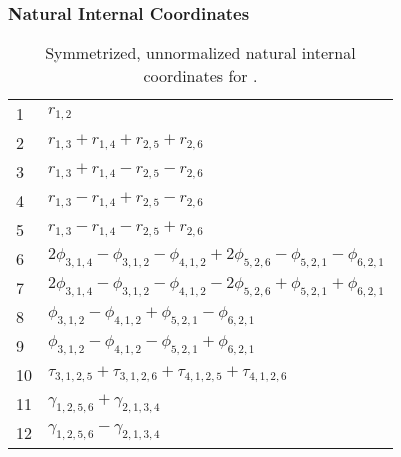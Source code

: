 \documentclass[10pt,oneside]{article}
\begin{document}
\subsubsection*{Natural Internal Coordinates}
\begin{table}[h!]
\centering
\caption{Symmetrized, unnormalized natural internal coordinates for .}
\small
\begin{tabular}{ll}
  1   & $r_{1,2}$ \\
  2   & $r_{1,3} + r_{1,4} + r_{2,5} + r_{2,6}$ \\
  3   & $r_{1,3} + r_{1,4} - r_{2,5} - r_{2,6}$ \\
  4   & $r_{1,3} - r_{1,4} + r_{2,5} - r_{2,6}$ \\
  5   & $r_{1,3} - r_{1,4} - r_{2,5} + r_{2,6}$ \\
  6   & $2\phi_{3,1,4} - \phi_{3,1,2} - \phi_{4,1,2} + 2\phi_{5,2,6} - \phi_{5,2,1} - \phi_{6,2,1}$ \\
  7   & $2\phi_{3,1,4} - \phi_{3,1,2} - \phi_{4,1,2} - 2\phi_{5,2,6} + \phi_{5,2,1} + \phi_{6,2,1}$ \\
  8   & $\phi_{3,1,2} - \phi_{4,1,2} + \phi_{5,2,1} - \phi_{6,2,1}$ \\
  9   & $\phi_{3,1,2} - \phi_{4,1,2} - \phi_{5,2,1} + \phi_{6,2,1}$ \\
  10  & $\tau_{3,1,2,5} + \tau_{3,1,2,6} + \tau_{4,1,2,5} + \tau_{4,1,2,6}$ \\
  11  & $\gamma_{1,2,5,6} + \gamma_{2,1,3,4}$ \\
  12  & $\gamma_{1,2,5,6} - \gamma_{2,1,3,4}$ \\
\end{tabular}
\end{table}

\clearpage

\subsection{\ \ \ }
\end{document}
